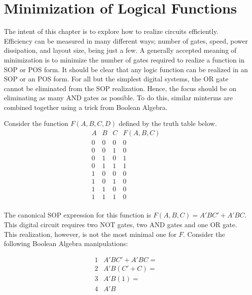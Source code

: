 \chapter{Minimization of Logical Functions}
\label{chapter:Minimization of Logical Functions}
\graphicspath{ {./chapter03/Fig} }

The intent of this chapter is to explore how to realize
circuits efficiently.  Efficiency can be measured in
many different ways; number of gates, speed, power
dissipation, and layout size, being just a few. A generally
accepted meaning of minimization is to
minimize the number of gates required to realize
a function in SOP or POS form.  It should be clear that
any logic function can be realized in an SOP or an POS form.
For all but the simplest digital systems, the OR gate cannot
be eliminated from the SOP realization.  Hence, the focus should
be on eliminating as many AND gates as possible.
To do this, similar minterms are combined together
using a trick from Boolean Algebra.

Consider the function $F(A,B,C,D)$ defined by the truth table
below.
$$
\begin{array}{c|c|c||c}
    A & B & C & F(A,B,C)  \\ \hline
    0 & 0 & 0 & 0 \\ \hline
    0 & 0 & 1 & 0 \\ \hline
    0 & 1 & 0 & 1 \\ \hline
    0 & 1 & 1 & 1 \\ \hline
    1 & 0 & 0 & 0 \\ \hline
    1 & 0 & 1 & 0 \\ \hline
    1 & 1 & 0 & 0 \\ \hline
    1 & 1 & 1 & 0 \\
\end{array} $$

The canonical SOP expression for this function is $F(A,B,C)=A'BC' + A'BC$.
This digital circuit requires two NOT gates, two AND gates and one OR gate.
This realization, however, is not the most minimal one for $F$.  Consider
the following Boolean Algebra manipulations:

$$
\begin{array}{cl}
    1 & A'BC' + A'BC = \\
    2 & A'B(C' + C) = \\
    3 & A'B(1) = \\
    4 & A'B
\end{array}$$

